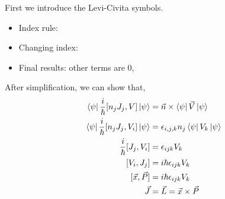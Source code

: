 \documentclass{school-22.101-notes}
\begin{document}
First we introduce the Levi-Civita symbols. 
\begin{itemize}
\item Index rule: 
\item Changing index: 
\item Final results: other terms are 0, 
\end{itemize}


After simplification, we can show that, 
\begin{align}
\left< \psi \right| \frac{i}{\hbar} [n_j J_j, V] \left| \psi \right>  &= \vec{n} \times \left< \psi \right| \vec{V} \left| \psi \right> \\
\left< \psi \right| \frac{i}{\hbar} [n_j J_j, V_i] \left| \psi \right> &= \epsilon_{i,j,k} n_j \left< \psi \right| V_k \left| \psi \right> \\
\frac{i}{\hbar} [J_j, V_i] &= \epsilon_{ijk} V_k \\
[V_i, J_j] &= i \hbar \epsilon_{ijk} V_k \\
[\vec{x}, \vec{P} ] &= i \hbar \epsilon_{ijk} V_k \\
\vec{J} &= \vec{L} = \vec{x} \times \vec{P} 
\end{align}
\end{document}
